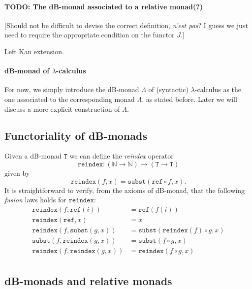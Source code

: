 \documentclass[a4paper,twoside,12pt]{article}
\theoremstyle{definition}
\theoremstyle{remark}
\newcommand{\NN}{\mathbb{N}}
\newcommand{\subst}{\mathtt{subst}}
\newcommand{\refe}{\mathtt{ref}}
\newcommand{\reindex}{\mathtt{reindex}}
\newcommand{\TT}{\mathtt{T}}
\begin{document}
\paragraph{TODO: The dB-monad associated to a relative monad(?)}

[Should not be difficult to devise the correct definition, \emph{n'est
  pas}?  I guess we just need to require the appropriate condition on
the functor $J$.]

Left Kan extension.

\paragraph{dB-monad of $\lambda$-calculus}

For now, we simply introduce the dB-monad $\mathsf{\Lambda}$ of
(syntactic) $\lambda$-calculus as the one associated to the
corresponding monad $\Lambda$, as stated before.  Later we will
discuss a more explicit construction of $\mathtt{\Lambda}$.

\subsection{Functoriality of dB-monads}
\label{sec:further-operators-db}

Given a dB-monad $\TT$ we can define the \emph{reindex} operator
\begin{equation*}
  \reindex\colon (\NN \to \NN) \to (\TT \to \TT)
\end{equation*}
given by
\begin{equation*}
  \reindex(f,x) = \subst(\refe \circ f, x).
\end{equation*}
It is straightforward to verify, from the axioms of dB-monad, that the
following \emph{fusion} laws holds for $\reindex$:
\begin{align*}
  \reindex(f,\refe(i)) &= \refe(f(i)) \\
  \reindex(\refe,x) &= x \\
  \reindex(f,\subst(g,x)) &= \subst(\reindex(f) \circ g, x) \\
  \subst(f,\reindex(g,x)) &= \subst(f \circ g,x) \\
  \reindex(f,\reindex(g,x)) &= \reindex(f\circ g, x) \\
\end{align*}

\subsection{dB-monads and relative monads}
\label{sec:subst-rel-monads}
\end{document}
